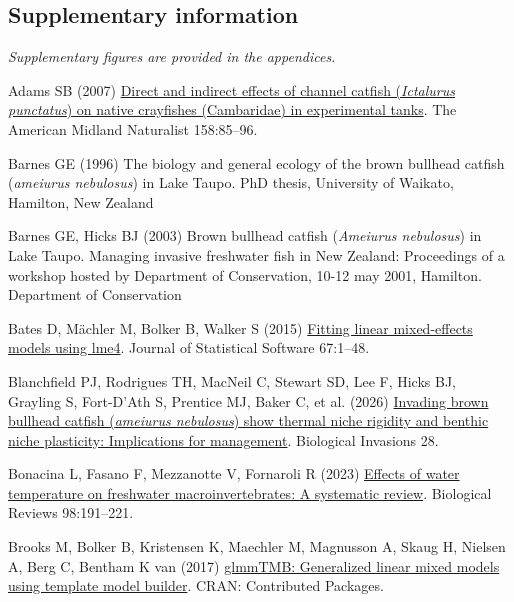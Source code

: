 \documentclass[
  letterpaper,
  DIV=11,
  numbers=noendperiod]{scrartcl}
\newlength{\cslhangindent}
\newenvironment{CSLReferences}[2] %
 {\begin{list}{}{%
  \setlength{\itemindent}{0pt}
  \setlength{\leftmargin}{0pt}
  \setlength{\parsep}{0pt}
  \ifodd #1
   \setlength{\leftmargin}{\cslhangindent}
   \setlength{\itemindent}{-1\cslhangindent}
  \fi
  \setlength{\itemsep}{#2\baselineskip}}}
 {\end{list}}
\begin{document}
\subsection{Supplementary information}\label{supplementary-information}

\emph{Supplementary figures are provided in the appendices.}

\protect{}\label{refs}
\begin{CSLReferences}{1}{1}
Adams SB (2007)
\href{https://doi.org/10.1674/0003-0031(2007)158\%5B85:daieoc\%5D2.0.co;2}{Direct
and indirect effects of channel catfish ({\emph{Ictalurus punctatus}})
on native crayfishes ({Cambaridae}) in experimental tanks}. The American
Midland Naturalist 158:85--96.

Barnes GE (1996) The biology and general ecology of the brown bullhead
catfish (\emph{ameiurus nebulosus}) in {Lake Taupo}. PhD thesis,
University of Waikato, Hamilton, New Zealand

Barnes GE, Hicks BJ (2003) Brown bullhead catfish ({\emph{Ameiurus
nebulosus}}) in {Lake Taupo}. Managing invasive freshwater fish in {New
Zealand}: Proceedings of a workshop hosted by {Department of
Conservation}, 10-12 may 2001, {Hamilton}. Department of Conservation

Bates D, Mächler M, Bolker B, Walker S (2015)
\href{https://doi.org/10.18637/jss.v067.i01}{Fitting linear
mixed-effects models using {lme4}}. Journal of Statistical Software
67:1--48.

Blanchfield PJ, Rodrigues TH, MacNeil C, Stewart SD, Lee F, Hicks BJ,
Grayling S, Fort-D'Ath S, Prentice MJ, Baker C, et al. (2026)
\href{https://doi.org/10.1007/s10530-026-03877-5}{Invading brown
bullhead catfish (\emph{ameiurus nebulosus}) show thermal niche rigidity
and benthic niche plasticity: Implications for management}. Biological
Invasions 28.

Bonacina L, Fasano F, Mezzanotte V, Fornaroli R (2023)
\href{https://doi.org/10.1111/brv.12903}{Effects of water temperature on
freshwater macroinvertebrates: A systematic review}. Biological Reviews
98:191--221.

Brooks M, Bolker B, Kristensen K, Maechler M, Magnusson A, Skaug H,
Nielsen A, Berg C, Bentham K van (2017)
\href{https://doi.org/10.32614/cran.package.glmmtmb}{glmmTMB:
Generalized linear mixed models using template model builder}. CRAN:
Contributed Packages.


\end{CSLReferences}
\end{document}
